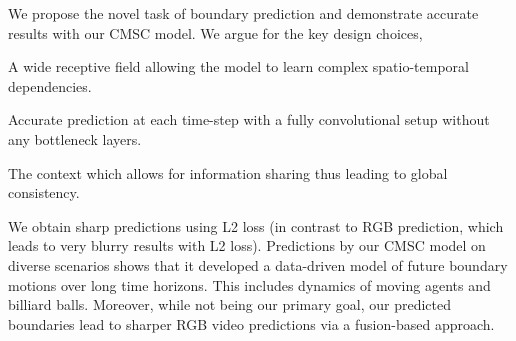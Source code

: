 We propose the novel task of boundary prediction and demonstrate accurate results with our CMSC model. We argue for the key design choices,  
\begin{enumerate*}
    \item A wide receptive field allowing the model to learn complex spatio-temporal dependencies.
    \item Accurate prediction at each time-step with a fully convolutional setup without any bottleneck layers.
    \item The context which allows for information sharing thus leading to global consistency. 
\end{enumerate*}
 We obtain sharp predictions using L2 loss (in contrast to RGB prediction, which leads to very blurry results with L2 loss). Predictions by our CMSC model on diverse scenarios shows that it developed a data-driven model of future boundary motions over long time horizons. This includes dynamics of moving agents and  billiard balls. Moreover, while not being our primary goal, our predicted boundaries lead to sharper RGB video predictions via a fusion-based approach.